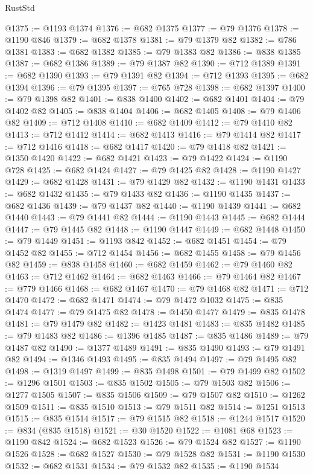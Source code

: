 \begin{lexlean}{RustStd}
\begin{coremodule}
@1375 := @1193 @1374
@1376 := @682 @1375
@1377 := @79 @1376
@1378 := @1190 @846
@1379 := @682 @1378
@1381 := @79 @1379 @82
@1382 := @786 @1381
@1383 := @682 @1382
@1385 := @79 @1383 @82
@1386 := @838 @1385
@1387 := @682 @1386
@1389 := @79 @1387 @82
@1390 := @712 @1389
@1391 := @682 @1390
@1393 := @79 @1391 @82
@1394 := @712 @1393
@1395 := @682 @1394
@1396 := @79 @1395
@1397 := @765 @728
@1398 := @682 @1397
@1400 := @79 @1398 @82
@1401 := @838 @1400
@1402 := @682 @1401
@1404 := @79 @1402 @82
@1405 := @838 @1404
@1406 := @682 @1405
@1408 := @79 @1406 @82
@1409 := @712 @1408
@1410 := @682 @1409
@1412 := @79 @1410 @82
@1413 := @712 @1412
@1414 := @682 @1413
@1416 := @79 @1414 @82
@1417 := @712 @1416
@1418 := @682 @1417
@1420 := @79 @1418 @82
@1421 := @1350 @1420
@1422 := @682 @1421
@1423 := @79 @1422
@1424 := @1190 @728
@1425 := @682 @1424
@1427 := @79 @1425 @82
@1428 := @1190 @1427
@1429 := @682 @1428
@1431 := @79 @1429 @82
@1432 := @1190 @1431
@1433 := @682 @1432
@1435 := @79 @1433 @82
@1436 := @1190 @1435
@1437 := @682 @1436
@1439 := @79 @1437 @82
@1440 := @1190 @1439
@1441 := @682 @1440
@1443 := @79 @1441 @82
@1444 := @1190 @1443
@1445 := @682 @1444
@1447 := @79 @1445 @82
@1448 := @1190 @1447
@1449 := @682 @1448
@1450 := @79 @1449
@1451 := @1193 @842
@1452 := @682 @1451
@1454 := @79 @1452 @82
@1455 := @712 @1454
@1456 := @682 @1455
@1458 := @79 @1456 @82
@1459 := @838 @1458
@1460 := @682 @1459
@1462 := @79 @1460 @82
@1463 := @712 @1462
@1464 := @682 @1463
@1466 := @79 @1464 @82
@1467 := @779 @1466
@1468 := @682 @1467
@1470 := @79 @1468 @82
@1471 := @712 @1470
@1472 := @682 @1471
@1474 := @79 @1472 @1032
@1475 := @835 @1474
@1477 := @79 @1475 @82
@1478 := @1450 @1477
@1479 := @835 @1478
@1481 := @79 @1479 @82
@1482 := @1423 @1481
@1483 := @835 @1482
@1485 := @79 @1483 @82
@1486 := @1396 @1485
@1487 := @835 @1486
@1489 := @79 @1487 @82
@1490 := @1377 @1489
@1491 := @835 @1490
@1493 := @79 @1491 @82
@1494 := @1346 @1493
@1495 := @835 @1494
@1497 := @79 @1495 @82
@1498 := @1319 @1497
@1499 := @835 @1498
@1501 := @79 @1499 @82
@1502 := @1296 @1501
@1503 := @835 @1502
@1505 := @79 @1503 @82
@1506 := @1277 @1505
@1507 := @835 @1506
@1509 := @79 @1507 @82
@1510 := @1262 @1509
@1511 := @835 @1510
@1513 := @79 @1511 @82
@1514 := @1251 @1513
@1515 := @835 @1514
@1517 := @79 @1515 @82
@1518 := @1244 @1517
@1520 := @834 (@835 @1518)
@1521 := @30 @1520
@1522 := @1081 @68
@1523 := @1190 @842
@1524 := @682 @1523
@1526 := @79 @1524 @82
@1527 := @1190 @1526
@1528 := @682 @1527
@1530 := @79 @1528 @82
@1531 := @1190 @1530
@1532 := @682 @1531
@1534 := @79 @1532 @82
@1535 := @1190 @1534

\end{coremodule}
\end{lexlean}
